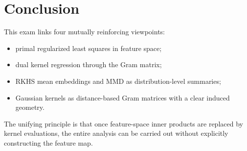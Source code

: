\documentclass[11pt]{article}
\begin{document}
\section{Conclusion}

This exam links four mutually reinforcing viewpoints:
\begin{itemize}
\item primal regularized least squares in feature space;
\item dual kernel regression through the Gram matrix;
\item RKHS mean embeddings and MMD as distribution-level summaries;
\item Gaussian kernels as distance-based Gram matrices with a clear induced geometry.
\end{itemize}

The unifying principle is that once feature-space inner products are replaced by kernel evaluations, the entire analysis can be carried out without explicitly constructing the feature map.
\end{document}
